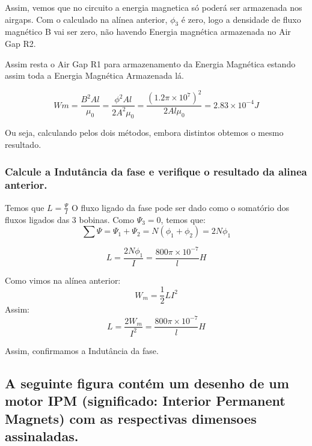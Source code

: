 \documentclass{article}
\begin{document}
Assim, vemos que no circuito a energia magnetica só poderá ser armazenada nos airgaps. 
Com o calculado na alínea anterior, $\phi_3$ é zero, logo a densidade de fluxo magnético B vai ser zero, não havendo Energia magnética armazenada no Air Gap R2.

Assim resta o Air Gap R1 para armazenamento da Energia Magnética estando assim toda a Energia Magnética Armazenada lá.

$$Wm = \frac{B^{2}Al}{\mu_0} = \frac{\phi^{2}Al}{2A^{2}\mu_0} = \frac{(1.2\pi \times 10^{7})^{2}}{2 Al \mu_0} = 2.83 \times 10 ^{-4} J$$

Ou seja, calculando pelos dois métodos, embora distintos obtemos o mesmo resultado.
 

\subsubsection{Calcule a Indutância da fase e verifique o resultado da alinea anterior.}

Temos que $L = \frac{\Psi}{I}$ 
O fluxo ligado da fase pode ser dado como o somatório dos fluxos ligados das 3 bobinas. Como $\Psi_3 = 0$, temos que:
$$\sum \Psi = \Psi_1 + \Psi_2 = N(\phi_1 + \phi_2) = 2N\phi_1$$

$$L = \frac{2N\phi_1}{I} = \frac{800\pi \times 10^{-7}}{l} H$$


Como vimos na alínea anterior: 
$$W_m = \frac{1}{2}LI^{2}$$
Assim:
$$L = \frac{2W_m}{I^{2}} = \frac{800\pi \times 10^{-7}}{l} {H}$$

Assim, confirmamos a Indutância da fase.
\subsection{A seguinte figura contém um desenho de um motor IPM (significado: Interior Permanent Magnets) com as respectivas dimensoes assinaladas.}
\end{document}
